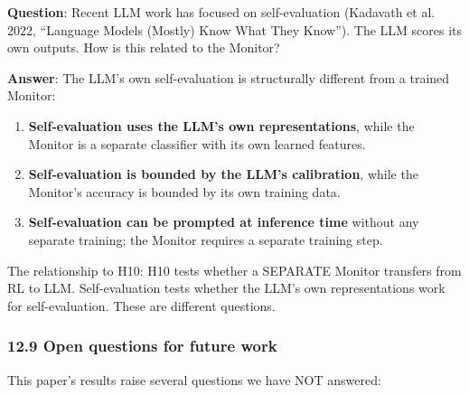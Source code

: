 \documentclass[11pt]{article}
\begin{document}
\textbf{Question}: Recent LLM work has focused on self-evaluation
(Kadavath et al. 2022, ``Language Models (Mostly) Know What They
Know''). The LLM scores its own outputs. How is this related to the
Monitor?

\textbf{Answer}: The LLM's own self-evaluation is structurally different
from a trained Monitor:

\begin{enumerate}
\def\labelenumi{\arabic{enumi}.}
\item
  \textbf{Self-evaluation uses the LLM's own representations}, while the
  Monitor is a separate classifier with its own learned features.
\item
  \textbf{Self-evaluation is bounded by the LLM's calibration}, while
  the Monitor's accuracy is bounded by its own training data.
\item
  \textbf{Self-evaluation can be prompted at inference time} without any
  separate training; the Monitor requires a separate training step.
\end{enumerate}

The relationship to H10: H10 tests whether a SEPARATE Monitor transfers
from RL to LLM. Self-evaluation tests whether the LLM's own
representations work for self-evaluation. These are different questions.

\subsubsection{12.9 Open questions for future
work}\label{open-questions-for-future-work}

This paper's results raise several questions we have NOT answered:
\end{document}
